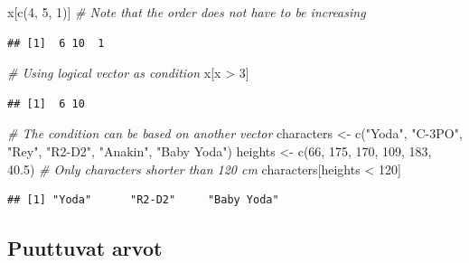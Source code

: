 \documentclass[
]{book}
\newenvironment{Shaded}{\begin{snugshade}}{\end{snugshade}}
\newcommand{\CommentTok}[1]{\textcolor[rgb]{0.56,0.35,0.01}{\textit{#1}}}
\newcommand{\DecValTok}[1]{\textcolor[rgb]{0.00,0.00,0.81}{#1}}
\newcommand{\FloatTok}[1]{\textcolor[rgb]{0.00,0.00,0.81}{#1}}
\newcommand{\FunctionTok}[1]{\textcolor[rgb]{0.00,0.00,0.00}{#1}}
\newcommand{\NormalTok}[1]{#1}
\newcommand{\OtherTok}[1]{\textcolor[rgb]{0.56,0.35,0.01}{#1}}
\newcommand{\SpecialCharTok}[1]{\textcolor[rgb]{0.00,0.00,0.00}{#1}}
\newcommand{\StringTok}[1]{\textcolor[rgb]{0.31,0.60,0.02}{#1}}
\begin{document}
\begin{Shaded}
\begin{Highlighting}[]
\NormalTok{x[}\FunctionTok{c}\NormalTok{(}\DecValTok{4}\NormalTok{, }\DecValTok{5}\NormalTok{, }\DecValTok{1}\NormalTok{)] }\CommentTok{\# Note that the order does not have to be increasing}
\end{Highlighting}
\end{Shaded}

\begin{verbatim}
## [1]  6 10  1
\end{verbatim}

\begin{Shaded}
\begin{Highlighting}[]
\CommentTok{\# Using logical vector as condition}
\NormalTok{x[x }\SpecialCharTok{\textgreater{}} \DecValTok{3}\NormalTok{]}
\end{Highlighting}
\end{Shaded}

\begin{verbatim}
## [1]  6 10
\end{verbatim}

\begin{Shaded}
\begin{Highlighting}[]
\CommentTok{\# The condition can be based on another vector}
\NormalTok{characters }\OtherTok{\textless{}{-}} \FunctionTok{c}\NormalTok{(}\StringTok{"Yoda"}\NormalTok{, }\StringTok{"C{-}3PO"}\NormalTok{, }\StringTok{"Rey"}\NormalTok{, }\StringTok{"R2{-}D2"}\NormalTok{, }\StringTok{"Anakin"}\NormalTok{, }\StringTok{"Baby Yoda"}\NormalTok{)}
\NormalTok{heights }\OtherTok{\textless{}{-}} \FunctionTok{c}\NormalTok{(}\DecValTok{66}\NormalTok{, }\DecValTok{175}\NormalTok{, }\DecValTok{170}\NormalTok{, }\DecValTok{109}\NormalTok{, }\DecValTok{183}\NormalTok{, }\FloatTok{40.5}\NormalTok{)}
\CommentTok{\# Only characters shorter than 120 cm}
\NormalTok{characters[heights }\SpecialCharTok{\textless{}} \DecValTok{120}\NormalTok{]}
\end{Highlighting}
\end{Shaded}

\begin{verbatim}
## [1] "Yoda"      "R2-D2"     "Baby Yoda"
\end{verbatim}

\hypertarget{puuttuvat-arvot}{%
\subsection{Puuttuvat arvot}\label{puuttuvat-arvot}}
\end{document}
